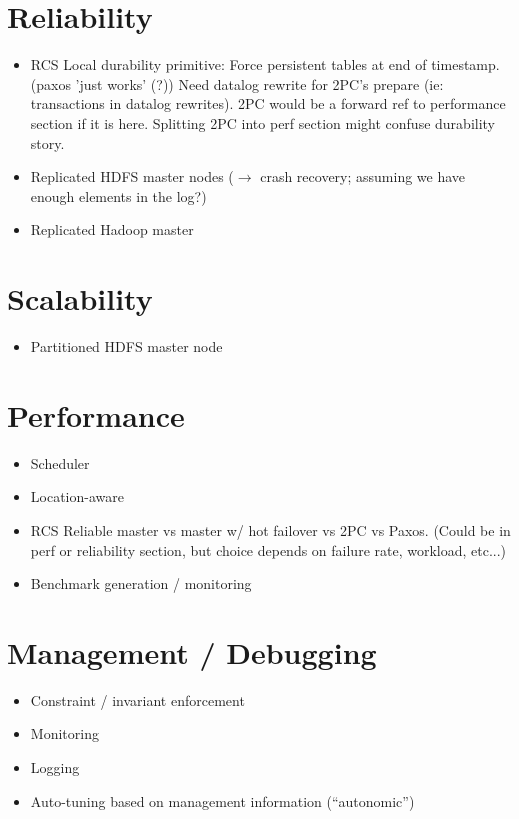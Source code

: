 \documentclass{sig-alternate}
\begin{document}
\section{Reliability}
\begin{itemize}
\item
  RCS Local durability primitive: Force persistent tables at end of
  timestamp.  (paxos 'just works' (?)) Need datalog rewrite for 2PC's
  prepare (ie: transactions in datalog rewrites).  2PC would be a
  forward ref to performance section if it is here.  Splitting 2PC
  into perf section might confuse durability story.

\item
  Replicated HDFS master nodes ($\to$ crash recovery; assuming we have
  enough elements in the log?)

\item
  Replicated Hadoop master

\end{itemize}

\section{Scalability}
\begin{itemize}
\item
  Partitioned HDFS master node
\end{itemize}

\section{Performance}
\begin{itemize}
\item
  Scheduler
\item
  Location-aware
\item
  RCS Reliable master vs master w/ hot failover vs 2PC vs Paxos.  (Could be in perf or reliability section, but choice depends on failure rate, workload, etc...)
\item
  Benchmark generation / monitoring
\end{itemize}

\section{Management / Debugging}
\begin{itemize}
\item
  Constraint / invariant enforcement
\item
  Monitoring
\item
  Logging
\item
  Auto-tuning based on management information (``autonomic'')
\end{itemize}
\end{document}
